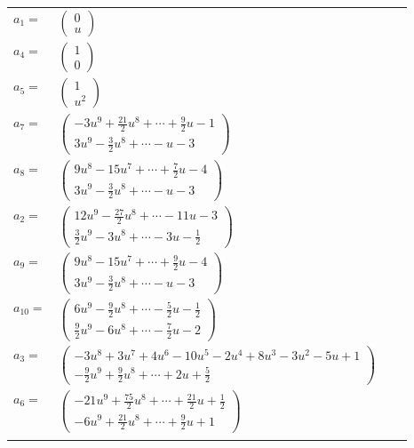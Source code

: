 \documentclass[1p]{elsarticle_modified}
\theoremstyle{definition}
\begin{document}
\begin{tabular}{m{7pt} m{180pt} m{7pt} m{180pt} }
\flushright $a_{1}=$&$\begin{pmatrix}0\\u\end{pmatrix}$ \\
\flushright $a_{4}=$&$\begin{pmatrix}1\\0\end{pmatrix}$ \\
\flushright $a_{5}=$&$\begin{pmatrix}1\\u^2\end{pmatrix}$ \\
\flushright $a_{7}=$&$\begin{pmatrix}-3 u^9+\frac{21}{2} u^8+\cdots+\frac{9}{2} u-1\\3 u^9-\frac{3}{2} u^8+\cdots- u-3\end{pmatrix}$ \\
\flushright $a_{8}=$&$\begin{pmatrix}9 u^8-15 u^7+\cdots+\frac{7}{2} u-4\\3 u^9-\frac{3}{2} u^8+\cdots- u-3\end{pmatrix}$ \\
\flushright $a_{2}=$&$\begin{pmatrix}12 u^9-\frac{27}{2} u^8+\cdots-11 u-3\\\frac{3}{2} u^9-3 u^8+\cdots-3 u-\frac{1}{2}\end{pmatrix}$ \\
\flushright $a_{9}=$&$\begin{pmatrix}9 u^8-15 u^7+\cdots+\frac{9}{2} u-4\\3 u^9-\frac{3}{2} u^8+\cdots- u-3\end{pmatrix}$ \\
\flushright $a_{10}=$&$\begin{pmatrix}6 u^9-\frac{9}{2} u^8+\cdots-\frac{5}{2} u-\frac{1}{2}\\\frac{9}{2} u^9-6 u^8+\cdots-\frac{7}{2} u-2\end{pmatrix}$ \\
\flushright $a_{3}=$&$\begin{pmatrix}-3 u^8+3 u^7+4 u^6-10 u^5-2 u^4+8 u^3-3 u^2-5 u+1\\-\frac{9}{2} u^9+\frac{9}{2} u^8+\cdots+2 u+\frac{5}{2}\end{pmatrix}$ \\
\flushright $a_{6}=$&$\begin{pmatrix}-21 u^9+\frac{75}{2} u^8+\cdots+\frac{21}{2} u+\frac{1}{2}\\-6 u^9+\frac{21}{2} u^8+\cdots+\frac{9}{2} u+1\end{pmatrix}$\\&\end{tabular}
\end{document}
